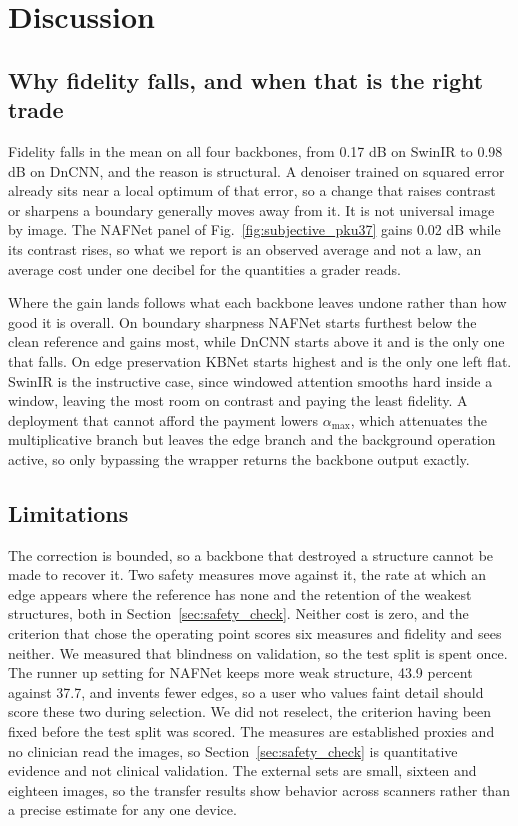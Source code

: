 \section{Discussion}
\label{sec:discussion}

\subsection{Why fidelity falls, and when that is the right trade}
\label{sec:psnr_tradeoff}
Fidelity falls in the mean on all four backbones, from 0.17 dB on SwinIR to 0.98 dB on DnCNN, and
the reason is structural. A denoiser trained on squared error already sits near a local optimum of
that error, so a change that raises contrast or sharpens a boundary generally moves away from it.
It is not universal image by image. The NAFNet panel of
Fig.~\ref{fig:subjective_pku37} gains 0.02 dB while its contrast rises, so what we report is an
observed average and not a law, an average cost under one decibel for the quantities a grader
reads.

Where the gain lands follows what each backbone leaves undone rather than how good it is overall. On
boundary sharpness NAFNet starts furthest below the clean reference and gains most, while DnCNN
starts above it and is the only one that falls. On edge preservation KBNet starts highest and is the
only one left flat. SwinIR is the instructive case, since windowed attention smooths hard inside a
window, leaving the most room on contrast and paying the least fidelity. A deployment that cannot
afford the payment lowers $\alpha_{\max}$, which attenuates the multiplicative branch but leaves the
edge branch and the background operation active, so only bypassing the wrapper returns the backbone
output exactly.

\subsection{Limitations}
The correction is bounded, so a backbone that destroyed a structure cannot be made to recover it. Two
safety measures move against it, the rate at which an edge appears where the reference has none and
the retention of the weakest structures, both in Section~\ref{sec:safety_check}. Neither cost is
zero, and the criterion that chose the operating point scores six measures and fidelity and sees
neither. We measured that blindness on validation, so the test split is spent once. The runner up setting for
NAFNet keeps more weak structure, 43.9 percent against 37.7, and invents fewer edges, so a user who
values faint detail should score these two during selection. We did not reselect, the criterion
having been fixed before the test split was scored. The measures are
established proxies and no clinician read the images, so Section~\ref{sec:safety_check} is
quantitative evidence and not clinical validation. The external sets are small, sixteen and eighteen
images, so the transfer results show behavior across scanners rather than a precise estimate for any
one device.
